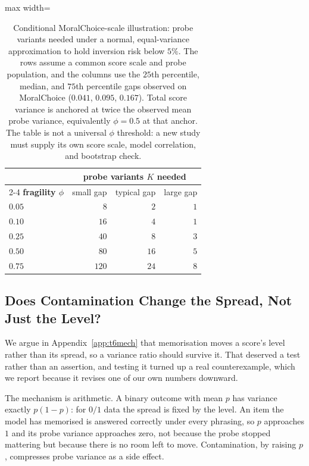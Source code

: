 \documentclass[11pt]{article}
\begin{document}
\begin{table}[t]
\centering
\small
\setlength{\tabcolsep}{4pt}
\renewcommand{\arraystretch}{1.12}
\begin{adjustbox}{max width=\columnwidth}
\begin{tabular}{@{}l r r r@{}}
\toprule
& \multicolumn{3}{c}{\textbf{probe variants $K$ needed}} \\
\cmidrule(l){2-4}
\textbf{fragility $\phi$} & small gap & typical gap & large gap \\
\midrule
$0.05$ & $8$   & $2$  & $1$ \\
$0.10$ & $16$  & $4$  & $1$ \\
$0.25$ & $40$  & $8$  & $3$ \\
$0.50$ & $80$  & $16$ & $5$ \\
$0.75$ & $120$ & $24$ & $8$ \\
\bottomrule
\end{tabular}
\end{adjustbox}
\caption{Conditional MoralChoice-scale illustration: probe variants needed under a
normal, equal-variance approximation to hold inversion risk below $5\%$. The
rows assume a common score scale and probe population, and the columns use the
$25$th percentile, median, and $75$th percentile gaps observed on MoralChoice
($0.041$, $0.095$, $0.167$). Total score variance is anchored at twice the
observed mean probe variance, equivalently $\phi=0.5$ at that anchor. The table
is not a universal $\phi$ threshold: a
new study must supply its own score scale, model correlation, and bootstrap
check.}
\label{tab:ktable}
\end{table}

\subsection{Does Contamination Change the Spread, Not Just the Level?}
\label{app:contam}

We argue in Appendix~\ref{app:t6mech} that memorisation moves a score's level
rather than its spread, so a variance ratio should survive it. That deserved a
test rather than an assertion, and testing it turned up a real counterexample,
which we report because it revises one of our own numbers downward.

The mechanism is arithmetic. A binary outcome with mean $p$ has variance exactly
$p(1-p)$: for $0/1$ data the spread is fixed by the level. An item the model has
memorised is answered correctly under every phrasing, so $p$ approaches $1$ and
its probe variance approaches zero, not because the probe stopped mattering but
because there is no room left to move. Contamination, by raising $p$, compresses
probe variance as a side effect.
\end{document}
